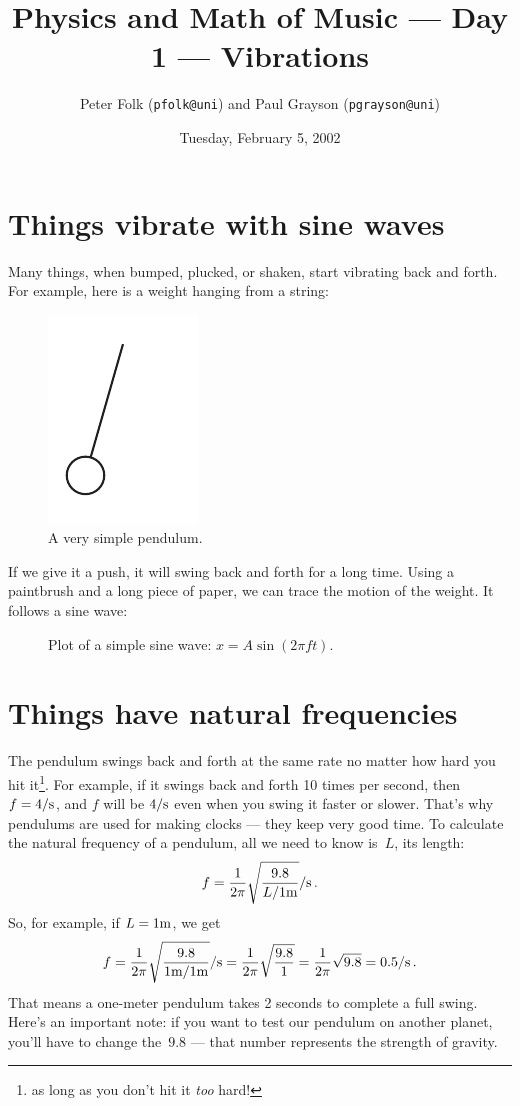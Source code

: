 \documentclass{article}
\def\s{\hbox{s}}
\def\m{\hbox{m}}
\begin{document}
\title{Physics and Math of Music --- Day 1 --- Vibrations}
\date{Tuesday, February 5, 2002}
\author{Peter Folk ({\tt pfolk@uni}) and Paul Grayson ({\tt pgrayson@uni})}
\maketitle

\section*{Things vibrate with sine waves}
Many things, when bumped, plucked, or shaken, start vibrating back and
forth.  For example, here is a weight hanging from a string:

\begin{figure}[h]
\begin{center}
	\includegraphics{figures/pendulum.pdf}
	\caption{A very simple pendulum.}
	\label{sine_wave}
\end{center}
\end{figure}

If we give it a push, it will swing back and forth for a long time.
Using a paintbrush and a long piece of paper, we can trace the motion
of the weight.  It follows a sine wave:
\begin{figure}[h]
\begin{center}
	
	\caption{Plot of a simple sine wave: $x = A \sin(2\pi f t)$. }
	\label{sine_wave}
\end{center}
\end{figure}


\section*{Things have natural frequencies}
The pendulum swings back and forth at the same rate no
matter how hard you hit it\footnote{as long as you don't hit it {\it
too} hard!}.  For example, if it swings back and forth 10 times per
second, then $f = 4/\s$, and $f$ will be $4/\s$ even when you swing
it faster or slower.  That's why pendulums are used for making clocks
--- they keep very good time.  To calculate the natural frequency of a
pendulum, all we need to know is~$L$, its length:
$$ f = {1 \over 2\pi} \sqrt{9.8 \over L/1\m} /\s \,. $$
So, for example, if $L = 1\m$, we get
$$ f = {1 \over 2\pi} \sqrt{9.8 \over 1\m/1\m} /\s
     = {1 \over 2\pi} \sqrt{9.8 \over 1} 
     = {1 \over 2\pi} \sqrt{9.8} = 0.5/\s \,. $$
That means a one-meter pendulum takes 2 seconds to complete a full
swing.  Here's an important note: if you want to test our pendulum on
another planet, you'll have to change the~$9.8$ --- that number
represents the strength of gravity.
\end{document}
